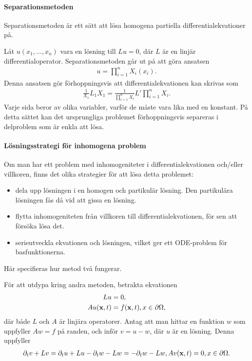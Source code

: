 \paragraph{Separationsmetoden}
Separationsmetoden är ett sätt att lösa homogena partiella differentialekvationer på.

Låt $u(x_{1}, \dots, x_{n})$ vara en lösning till $Lu = 0$, där $L$ är en linjär differentialoperator. Separationsmetoden går ut på att göra ansatsen
\begin{align*}
	u = \prod\limits_{i = 1}^{n}X_{i}(x_{i}).
\end{align*}
Denna ansatsen gör förhoppningsvis att differentialekvationen kan skrivas som
\begin{align*}
	\frac{1}{X_{1}}L_{1}X_{1} = \frac{1}{\prod\limits_{i = 1}^{n}X_{i}}L'\prod\limits_{i = 1}^{n}X_{i}.
\end{align*}
Varje sida beror av olika variabler, varför de måste vara lika med en konstant. På detta sättet kan det ursprungliga problemet förhoppningsvis separeras i delproblem som är enkla att lösa.

\paragraph{Lösningsstrategi för inhomogena problem}
Om man har ett problem med inhomogeniteter i differentialekvationen och/eller villkoren, finns det olika strategier för att lösa detta problemet:
\begin{itemize}
	\item dela upp lösningen i en homogen och partikulär lösning. Den partikulära lösningen fås då vid att gissa en lösning.
	\item flytta inhomogeniteten från villkoren till differentialekvationen, för sen att försöka lösa det.
	\item serieutveckla ekvationen och lösningen, vilket ger ett ODE-problem för basfunktionerna.
\end{itemize}
Här specifieras hur metod två fungerar.

För att utdypa kring andra metoden, betrakta ekvationen
\begin{align*}
	Lu            &= 0, \\
	Au(\vb{x}, t) &= f(\vb{x}, t), x\in\partial \Omega,
\end{align*}
där både $L$ och $A$ är linjära operatorer. Antag att man hittar en funktion $w$ som uppfyller $Aw = f$ på randen, och inför $v = u - w$, där $u$ är en lösning. Denna uppfyller
\begin{align*}
	\partial_{t}v + Lv = \partial_{t}u + Lu - \partial_{t}w - Lw = -\partial_{t}w - Lw,
	Av(\vb{x}, t) = 0, x\in\partial \Omega.
\end{align*}